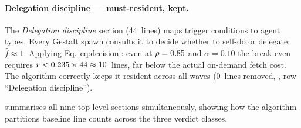 \paragraph{Delegation discipline — must-resident, kept.}
The \textit{Delegation discipline} section (44~lines) maps trigger
conditions to agent types.  Every Gestalt spawn consults it to decide
whether to self-do or delegate; $\hat{f} \approx 1$.  Applying
Eq.\,\eqref{eq:decision}: even at $\rho = 0.85$ and $\alpha = 0.10$
the break-even requires $r < 0.235 \times 44 \approx 10$~lines,
far below the actual on-demand fetch cost.  The algorithm correctly keeps
it resident across all waves (0~lines removed,
, row ``Delegation discipline'').

 summarises all nine top-level sections
simultaneously, showing how the algorithm partitions baseline line counts
across the three verdict classes.

